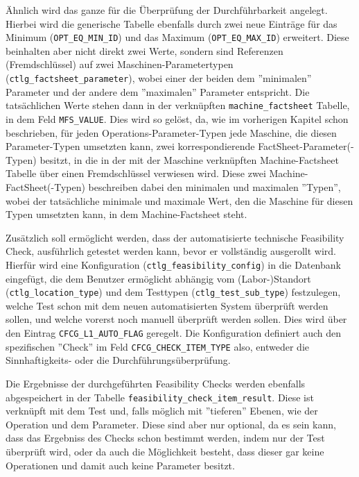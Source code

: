 Ähnlich wird das ganze für die Überprüfung der Durchführbarkeit angelegt. Hierbei wird die generische Tabelle ebenfalls durch zwei neue Einträge für das Minimum (\texttt{OPT\_EQ\_MIN\_ID}) und das Maximum (\texttt{OPT\_EQ\_MAX\_ID}) erweitert. Diese beinhalten aber nicht direkt zwei Werte, sondern sind Referenzen (Fremdschlüssel) auf zwei Maschinen-Parametertypen (\texttt{ctlg\_factsheet\_parameter}), wobei einer der beiden dem ''minimalen'' Parameter und der andere dem ''maximalen'' Parameter entspricht. Die tatsächlichen Werte stehen dann in der verknüpften \texttt{machine\_factsheet} Tabelle, in dem Feld \texttt{MFS\_VALUE}. Dies wird so gelöst, da, wie im vorherigen Kapitel schon beschrieben, für jeden Operations-Parameter-Typen jede Maschine, die diesen Parameter-Typen umsetzten kann, zwei korrespondierende FactSheet-Parameter(-Typen) besitzt, in die in der mit der Maschine verknüpften Machine-Factsheet Tabelle über einen Fremdschlüssel verwiesen wird. Diese zwei Machine-FactSheet(-Typen) beschreiben dabei den minimalen und maximalen ''Typen'', wobei der tatsächliche minimale und maximale Wert, den die Maschine für diesen Typen umsetzten kann, in dem Machine-Factsheet steht.

Zusätzlich soll ermöglicht werden, dass der automatisierte technische Feasibility Check, ausführlich getestet werden kann, bevor er vollständig ausgerollt wird. Hierfür wird eine Konfiguration (\texttt{ctlg\_feasibility\_config}) in die Datenbank eingefügt, die dem Benutzer ermöglicht abhängig vom (Labor-)Standort (\texttt{ctlg\_location\_type}) und dem Testtypen (\texttt{ctlg\_test\_sub\_type}) festzulegen, welche Test schon mit dem neuen automatisierten System überprüft werden sollen, und welche vorerst noch manuell überprüft werden sollen. Dies wird über den Eintrag \texttt{CFCG\_L1\_AUTO\_FLAG} geregelt.
Die Konfiguration definiert auch den spezifischen ''Check'' im Feld \texttt{CFCG\_CHECK\_ITEM\_TYPE} also, entweder die Sinnhaftigkeits- oder die Durchführungsüberprüfung.

Die Ergebnisse der durchgeführten Feasibility Checks werden ebenfalls abgespeichert in der Tabelle \texttt{feasibility\_check\_item\_result}. Diese ist verknüpft mit dem Test und, falls möglich mit ''tieferen'' Ebenen, wie der Operation und dem Parameter. Diese sind aber nur optional, da es sein kann, dass das Ergebniss des Checks schon bestimmt werden, indem nur der Test überprüft wird, oder da auch die Möglichkeit besteht, dass dieser gar keine Operationen und damit auch keine Parameter besitzt.


